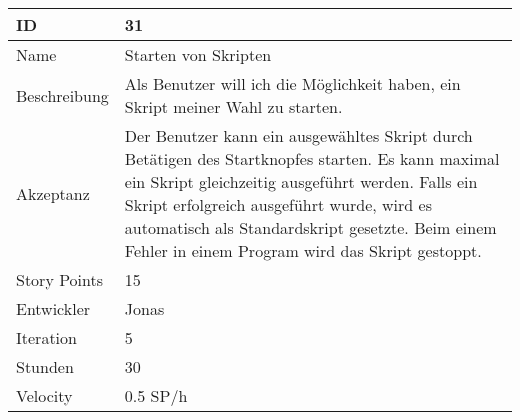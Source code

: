 \begin{table}[htbp]
    \begin{minipage}{\linewidth}
        \setlength{\tymax}{0.5\linewidth}
        \centering
        \small
        \begin{tabulary}{\textwidth}{|l|p{10cm}|} \hline
            ID   &31\\\hline
            Name  &Starten von Skripten\\\hline
            Beschreibung&Als Benutzer will ich die Möglichkeit haben, ein Skript meiner Wahl zu starten.\\\hline
	    Akzeptanz &Der Benutzer kann ein ausgewähltes Skript durch Betätigen des Startknopfes starten. Es kann maximal ein Skript gleichzeitig ausgeführt werden. Falls ein Skript erfolgreich ausgeführt wurde, wird es automatisch als Standardskript gesetzte. Beim einem Fehler in einem Program wird das Skript gestoppt.\\\hline
            Story Points&15\\\hline
            Entwickler &Jonas\\\hline
            Iteration &5\\\hline
            Stunden  &30\\\hline
            Velocity &0.5 SP\slash h\\\hline
        \end{tabulary}
    \end{minipage}
\end{table}



